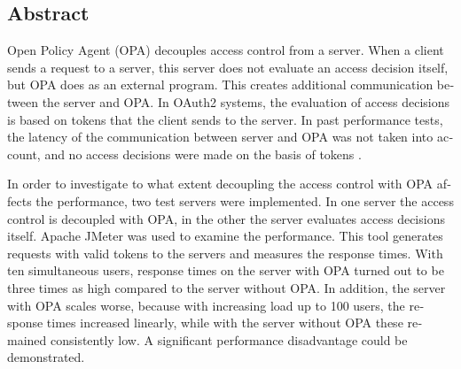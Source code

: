

\begin{otherlanguage}{american}
	\chapter*{Abstract}

	Open Policy Agent (OPA) decouples access control from a server. When a client sends a request to a server, this server does not evaluate an access decision itself, but OPA does as an external program. This creates additional communication between the server and OPA. In OAuth2 systems, the evaluation of access decisions is based on tokens that the client sends to the server. In past performance tests, the latency of the communication between server and OPA was not taken into account, and no access decisions were made on the basis of tokens \citep{opaperformance:2021:07}.\smallskip

	In order to investigate to what extent decoupling the access control with OPA affects the performance, two test servers were implemented. In one server the access control is decoupled with OPA, in the other the server evaluates access decisions itself. Apache JMeter was used to examine the performance. This tool generates requests with valid tokens to the servers and measures the response times. With ten simultaneous users, response times on the server with OPA turned out to be three times as high compared to the server without OPA. In addition, the server with OPA scales worse, because with increasing load up to 100 users, the response times increased linearly, while with the server without OPA these remained consistently low. A significant performance disadvantage could be demonstrated.


\end{otherlanguage}
